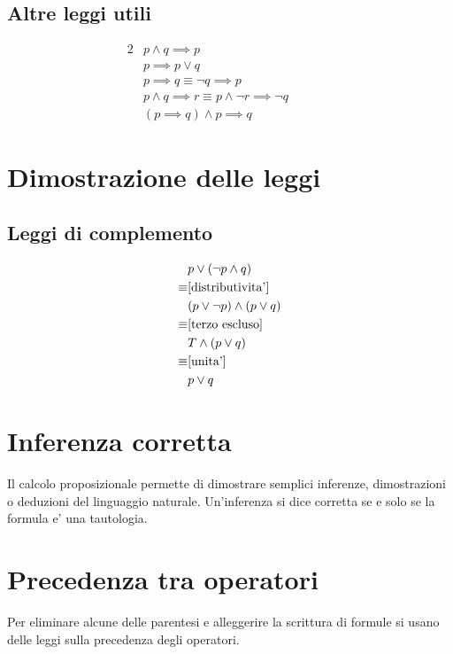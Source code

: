 \documentclass{report}
\newcommand{\AND}{\wedge}
\newcommand{\OR}{\vee}
\begin{document}
    \subsection{Altre leggi utili}
    \begin{alignat*}
        {2}
        & p \AND q \implies p                                           \qquad &&\tag{sempl-$\AND$}\\
        & p \implies p \OR q                                            \qquad &&\tag{introd-$\OR$}\\
        & p \implies q \equiv \neg q \implies p                         \qquad &&\tag{contropositiva}\\
        & p \AND q \implies r \equiv p \AND \neg r \implies \neg q      \qquad &&\tag{scambio}\\
        & (p \implies q) \AND p \implies q                              \qquad &&\tag{Modus Ponens}
    \end{alignat*}

    \section{Dimostrazione delle leggi}
    \subsection{Leggi di complemento}
    \begin{alignat*}
        {2}
                & p \OR (\neg p \AND q)\\
        \equiv  &{\ref{distributivita'}}\\
                & (p \OR \neg p) \AND (p \OR q)\\
        \equiv  &{\ref{terzo escluso}}\\
                & T \AND (p \OR q)\\
        \equiv  &{\ref{unita'}}\\
                & p \OR q
    \end{alignat*}

    \section{Inferenza corretta}
    Il calcolo proposizionale permette di dimostrare semplici inferenze, dimostrazioni o deduzioni del linguaggio
    naturale. Un'inferenza si dice corretta se e solo se la formula e' una tautologia.

    \section{Precedenza tra operatori}
    Per eliminare alcune delle parentesi e alleggerire la scrittura di formule si usano delle leggi
    sulla precedenza degli operatori.
\end{document}

